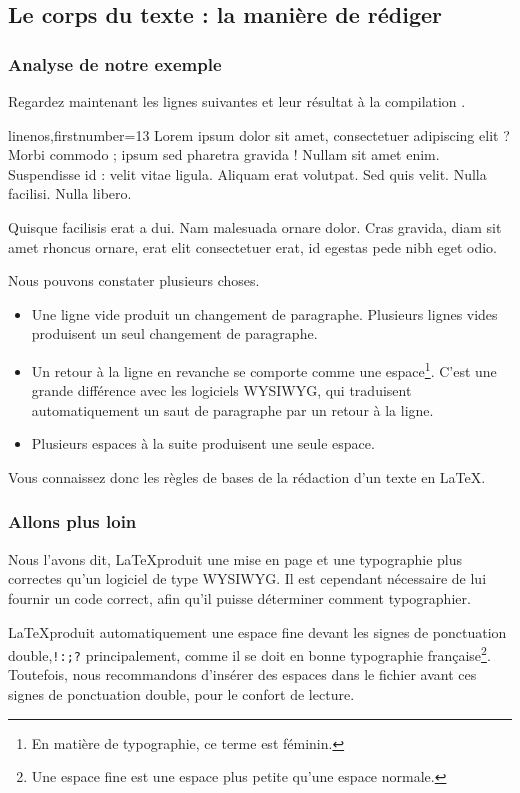 \subsection{Le corps du texte : la manière de rédiger}

\subsubsection{Analyse de notre exemple}
Regardez maintenant les lignes suivantes et leur résultat à la compilation .


\begin{latexcode*}{linenos,firstnumber=13}
Lorem ipsum dolor sit amet, consectetuer adipiscing elit ?
Morbi commodo ; ipsum sed pharetra gravida !
Nullam sit amet enim. Suspendisse id : velit vitae ligula.
Aliquam erat volutpat.
Sed quis velit. Nulla facilisi. Nulla libero. 

Quisque facilisis erat a dui.
Nam malesuada ornare dolor.
Cras gravida, diam sit amet rhoncus ornare, 
erat      elit consectetuer erat, id egestas pede nibh eget odio.
\end{latexcode*}


Nous pouvons constater plusieurs choses.
\begin{itemize}
\item Une ligne vide produit un changement de paragraphe. Plusieurs lignes vides produisent un seul changement de paragraphe.
\item Un retour à la ligne en revanche se comporte comme une espace\footnote{En matière de typographie, ce terme est féminin.}. C'est une grande différence avec les logiciels WYSIWYG, qui traduisent automatiquement un saut de paragraphe par un retour à la ligne.
\item Plusieurs espaces à la suite produisent une seule espace. 
\end{itemize}

Vous connaissez donc les règles de bases de la rédaction d'un texte en \LaTeX.

\subsubsection{Allons plus loin}


Nous l'avons dit, \LaTeX produit une mise en page et une typographie plus correctes qu'un logiciel de type WYSIWYG. Il est cependant nécessaire de lui fournir un code correct, afin qu'il puisse déterminer comment typographier.

\LaTeX produit automatiquement  une espace fine devant les signes de ponctuation double,\verb|!:;?| principalement, comme il se doit en bonne typographie fran\c caise\footnote{Une espace fine est une espace plus petite qu'une espace normale.}. Toutefois, nous recommandons d'insérer des espaces dans le fichier  avant ces signes de ponctuation double, pour le confort de lecture.

